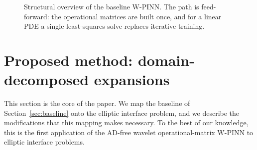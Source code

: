 \documentclass[pdflatex,sn-mathphys-num]{sn-jnl}%
\theoremstyle{thmstyleone}%
\theoremstyle{thmstyletwo}%
\theoremstyle{thmstylethree}%
\begin{document}
\begin{figure}[t]
\centering
{}
\caption{Structural overview of the baseline W-PINN. The path is feed-forward: the operational matrices are built once, and for a linear PDE a single least-squares solve replaces iterative training.}
\label{fig:baseline-block}
\end{figure}

\section{Proposed method: domain-decomposed expansions}\label{sec:proposed}

This section is the core of the paper. We map the baseline of Section~\ref{sec:baseline} onto the elliptic interface problem, and we describe the modifications that this mapping makes necessary. To the best of our knowledge, this is the first application of the AD-free wavelet operational-matrix W-PINN to elliptic interface problems.
\end{document}
